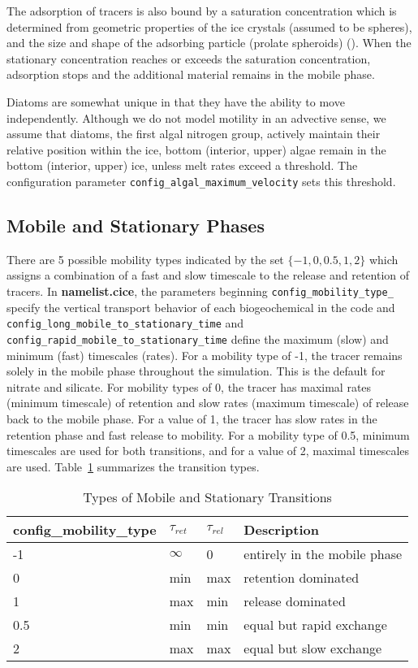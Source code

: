 The adsorption of tracers is also bound by a saturation concentration which is determined from geometric properties of the ice crystals (assumed to be spheres), and the size and shape of the adsorbing particle (prolate spheroids)  (\cite{Johnson:bac:1995}).  When the stationary concentration reaches or exceeds the saturation concentration, adsorption stops and the additional material remains in the mobile phase.

Diatoms are somewhat unique in that they have the ability to move independently. Although we do not model motility in an advective sense, we assume that diatoms, the first
algal nitrogen group, actively maintain their
relative position within the ice, \bgcie bottom (interior, upper) algae
remain in the bottom (interior, upper) ice, unless melt rates exceed a
threshold.  The configuration parameter {\tt config\_algal\_maximum\_velocity} sets this
threshold.

\subsection{Mobile and Stationary Phases}
\label{sec:mobile_and_stationary}
There are 5 possible mobility types indicated by the set $\{-1, 0,
0.5, 1, 2\}$ which assigns a combination of a fast and slow timescale
to the release and retention of tracers.  In {\bf namelist.cice}, the
parameters beginning {\tt config\_mobility\_type\_} specify the
vertical transport behavior of each biogeochemical in the code and
{\tt config\_long\_mobile\_to\_stationary\_time} and \newline
{\tt config\_rapid\_mobile\_to\_stationary\_time} define the maximum (slow) and minimum (fast)  timescales (rates).  For a mobility type of -1, the tracer remains solely in the mobile
phase throughout the simulation.  This is the default for nitrate and silicate.  For mobility types of 0, the tracer has maximal rates (\bgcie minimum timescale) of retention and slow rates (\bgcie maximum timescale) of release back to the mobile phase.  For a value of 1, the tracer has slow rates in
the retention phase and fast release to mobility.  For a mobility type of 0.5,
minimum timescales are used for both
transitions, and for a value of 2, maximal timescales are used. Table~\ref{table:phases} summarizes the transition types.

\begin{table}[t!]
\caption{Types of Mobile and Stationary Transitions}
\begin{tabular}{l|l|l|l} \hline
{\bf{config\_mobility\_type}} &$ \tau_{ret}$ & $\tau_{rel}$ & Description \\ \hline
-1  & $\infty$ & 0 & entirely in the mobile phase \\
0   & min & max & retention dominated \\
1   & max & min & release dominated \\
0.5   & min & min & equal but rapid exchange \\
2  & max & max & equal but slow exchange \\
\hline
\end{tabular}\label{table:phases}
\end{table}

